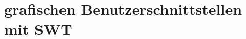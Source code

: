 \section{grafischen Benutzerschnittstellen mit SWT} \label{sec:impl-Benutzerschnittstellen}




















\label{sec:impl-Benutzerschnittstellen-ende}